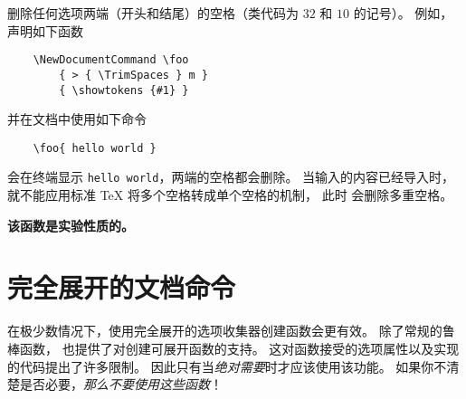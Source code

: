 \documentclass{l3doc}
\begin{document}
%
\begin{function}{\TrimSpaces}
\begin{syntax}
\end{syntax}
删除任何选项两端（开头和结尾）的空格（类代码为 $32$ 和 $10$ 的记号）。
例如，声明如下函数
\begin{verbatim}
    \NewDocumentCommand \foo
        { > { \TrimSpaces } m }
        { \showtokens {#1} }
\end{verbatim}
并在文档中使用如下命令
\begin{verbatim}
    \foo{ hello world }
\end{verbatim}
会在终端显示 \texttt{hello world}，两端的空格都会删除。
当输入的内容已经导入时，就不能应用标准 \TeX{} 将多个空格转成单个空格的机制，
此时  会删除多重空格。

%
\textbf{该函数是实验性质的。}
\end{function}

%
\section{完全展开的文档命令}

%
在极少数情况下，使用完全展开的选项收集器创建函数会更有效。
除了常规的鲁棒函数， 也提供了对创建可展开函数的支持。
这对函数接受的选项属性以及实现的代码提出了许多限制。
因此只有当\emph{绝对需要}时才应该使用该功能。
如果你不清楚是否必要，\emph{那么不要使用这些函数}！
\end{document}
